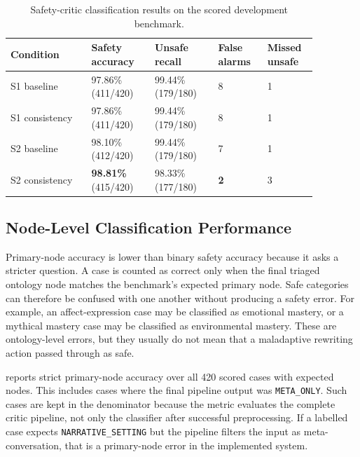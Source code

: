 \begin{table}
  \centering
  \caption{Safety-critic classification results on the scored development benchmark.}
  \label{tab:component-safety-results}
  \small
  \setlength{\tabcolsep}{4pt}
  \renewcommand{\arraystretch}{1.35}
  \begin{tabular}{p{0.23\linewidth}p{0.18\linewidth}p{0.18\linewidth}p{0.14\linewidth}p{0.14\linewidth}}
    \toprule
    Condition & Safety accuracy & Unsafe recall & False alarms & Missed unsafe \\
    \midrule
    S1 baseline & 97.86\%\newline (411/420) & 99.44\%\newline (179/180) & 8 & 1 \\
    \addlinespace[0.25em]
    S1 consistency & 97.86\%\newline (411/420) & 99.44\%\newline (179/180) & 8 & 1 \\
    \addlinespace[0.25em]
    S2 baseline & 98.10\%\newline (412/420) & 99.44\%\newline (179/180) & 7 & 1 \\
    \addlinespace[0.25em]
    S2 consistency & \textbf{98.81\%}\newline (415/420) & 98.33\%\newline (177/180) & \textbf{2} & 3 \\
    \bottomrule
  \end{tabular}
\end{table}

\subsection{Node-Level Classification Performance}

Primary-node accuracy is lower than binary safety accuracy because it asks a stricter question. A case is counted as correct only when the final triaged ontology node matches the benchmark's expected primary node. Safe categories can therefore be confused with one another without producing a safety error. For example, an affect-expression case may be classified as emotional mastery, or a mythical mastery case may be classified as environmental mastery. These are ontology-level errors, but they usually do not mean that a maladaptive rewriting action passed through as safe.

 reports strict primary-node accuracy over all 420 scored cases with expected nodes. This includes cases where the final pipeline output was \texttt{META\_ONLY}. Such cases are kept in the denominator because the metric evaluates the complete critic pipeline, not only the classifier after successful preprocessing. If a labelled case expects \texttt{NARRATIVE\_SETTING} but the pipeline filters the input as meta-conversation, that is a primary-node error in the implemented system.

